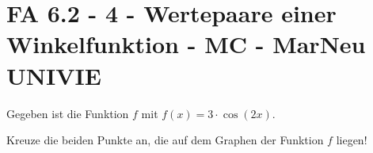 \section{FA 6.2 - 4 - Wertepaare einer Winkelfunktion - MC - MarNeu UNIVIE}

\begin{beispiel}[FA 6.2]{1}
Gegeben ist die Funktion $f$ mit $f(x)=3 \cdot \cos (2x)$.

Kreuze die beiden Punkte an, die auf dem Graphen der Funktion $f$ liegen!

\end{beispiel}